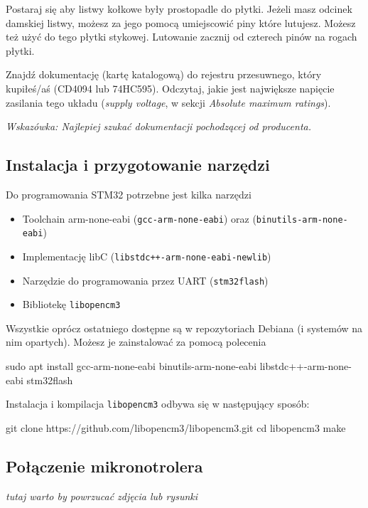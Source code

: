 \documentclass{pdfBooklets}
\begin{document}
Postaraj się aby listwy kołkowe były prostopadle do płytki. Jeżeli masz odcinek damskiej listwy, możesz za jego pomocą
umiejscowić piny które lutujesz. Możesz też użyć do tego płytki stykowej. Lutowanie zacznij od czterech pinów na rogach płytki.

\begin{Zadanie}{}{}
  Znajdź dokumentację (kartę katalogową) do rejestru przesuwnego, który kupiłeś/aś (CD4094 lub 74HC595).
  Odczytaj, jakie jest największe napięcie zasilania tego układu (\textit{supply voltage}, w sekcji
  \textit{Absolute maximum ratings}).

  \textit{Wskazówka: Najlepiej szukać dokumentacji pochodzącej od producenta.}
\end{Zadanie}




\subsection{Instalacja i przygotowanie narzędzi}

Do programowania STM32 potrzebne jest kilka narzędzi

\begin{itemize}
  \item Toolchain arm-none-eabi (\Verb$gcc-arm-none-eabi$) oraz (\Verb$binutils-arm-none-eabi$)
  \item Implementację libC (\Verb$libstdc++-arm-none-eabi-newlib$)
  \item Narzędzie do programowania przez UART (\Verb$stm32flash$)
  \item Bibliotekę \Verb$libopencm3$
\end{itemize}
Wszystkie oprócz ostatniego dostępne są w repozytoriach Debiana (i systemów na nim opartych). Możesz je zainstalować
za pomocą polecenia

\begin{CodeFrame*}[bash]{}
sudo apt install gcc-arm-none-eabi binutils-arm-none-eabi libstdc++-arm-none-eabi stm32flash
\end{CodeFrame*}

Instalacja i kompilacja \Verb$libopencm3$ odbywa się w następujący sposób:

\begin{CodeFrame*}[bash]{}
git clone https://github.com/libopencm3/libopencm3.git
cd libopencm3
make
\end{CodeFrame*}

\subsection{Połączenie mikronotrolera}
\textit {tutaj warto by powrzucać zdjęcia lub rysunki}
\end{document}
